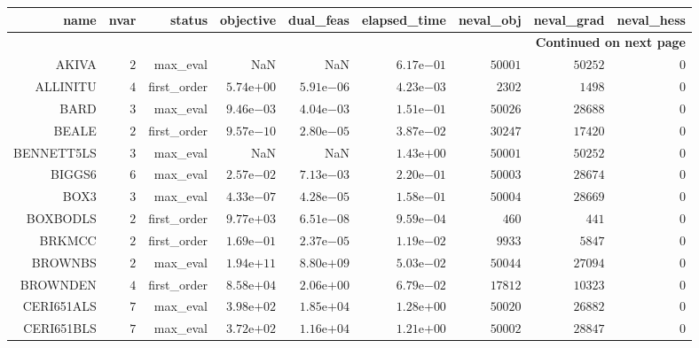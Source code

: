\begin{longtable}{rrrrrrrrr}
\hline
name & nvar & status & objective & dual\_feas & elapsed\_time & neval\_obj & neval\_grad & neval\_hess \\\hline
\endhead
\hline
\multicolumn{9}{r}{{\bfseries Continued on next page}}\\
\hline
\endfoot
\endlastfoot
AKIVA & \(     2\) & max\_eval &       NaN &       NaN & \( 6.17\)e\(-01\) & \( 50001\) & \( 50252\) & \(     0\) \\
ALLINITU & \(     4\) & first\_order & \( 5.74\)e\(+00\) & \( 5.91\)e\(-06\) & \( 4.23\)e\(-03\) & \(  2302\) & \(  1498\) & \(     0\) \\
BARD & \(     3\) & max\_eval & \( 9.46\)e\(-03\) & \( 4.04\)e\(-03\) & \( 1.51\)e\(-01\) & \( 50026\) & \( 28688\) & \(     0\) \\
BEALE & \(     2\) & first\_order & \( 9.57\)e\(-10\) & \( 2.80\)e\(-05\) & \( 3.87\)e\(-02\) & \( 30247\) & \( 17420\) & \(     0\) \\
BENNETT5LS & \(     3\) & max\_eval &       NaN &       NaN & \( 1.43\)e\(+00\) & \( 50001\) & \( 50252\) & \(     0\) \\
BIGGS6 & \(     6\) & max\_eval & \( 2.57\)e\(-02\) & \( 7.13\)e\(-03\) & \( 2.20\)e\(-01\) & \( 50003\) & \( 28674\) & \(     0\) \\
BOX3 & \(     3\) & max\_eval & \( 4.33\)e\(-07\) & \( 4.28\)e\(-05\) & \( 1.58\)e\(-01\) & \( 50004\) & \( 28669\) & \(     0\) \\
BOXBODLS & \(     2\) & first\_order & \( 9.77\)e\(+03\) & \( 6.51\)e\(-08\) & \( 9.59\)e\(-04\) & \(   460\) & \(   441\) & \(     0\) \\
BRKMCC & \(     2\) & first\_order & \( 1.69\)e\(-01\) & \( 2.37\)e\(-05\) & \( 1.19\)e\(-02\) & \(  9933\) & \(  5847\) & \(     0\) \\
BROWNBS & \(     2\) & max\_eval & \( 1.94\)e\(+11\) & \( 8.80\)e\(+09\) & \( 5.03\)e\(-02\) & \( 50044\) & \( 27094\) & \(     0\) \\
BROWNDEN & \(     4\) & first\_order & \( 8.58\)e\(+04\) & \( 2.06\)e\(+00\) & \( 6.79\)e\(-02\) & \( 17812\) & \( 10323\) & \(     0\) \\
CERI651ALS & \(     7\) & max\_eval & \( 3.98\)e\(+02\) & \( 1.85\)e\(+04\) & \( 1.28\)e\(+00\) & \( 50020\) & \( 26882\) & \(     0\) \\
CERI651BLS & \(     7\) & max\_eval & \( 3.72\)e\(+02\) & \( 1.16\)e\(+04\) & \( 1.21\)e\(+00\) & \( 50002\) & \( 28847\) & \(     0\) \\

\end{longtable}
